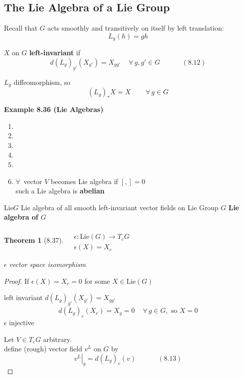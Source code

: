 \documentclass[11pt]{amsart}
\newtheorem{theorem}{Theorem}
\theoremstyle{definition}
\begin{document}
\subsection*{The Lie Algebra of a Lie Group}

Recall that $G$ acts smoothly and transitively on itself by left translation:
\[
L_g(h) = gh
\]

$X$ on $G$ \textbf{left-invariant} if
\begin{equation}
d(L_g)_{g'}(X_{g'}) = X_{gg'} \quad \, \forall \, g, g' \in G \quad \quad \quad \, (8.12)
\end{equation}

$L_g$ diffeomorphism, so
\[
(L_g)_*X = X \quad \quad \, \forall \, g \in G
\]





\textbf{Example 8.36 (Lie Algebras)}

\begin{enumerate}
\item[(a)]
\item[(b)]
\item[(c)]
\item[(d)]
\item[(e)]
\item[(f)] $\forall \, $ vector $V$ becomes Lie algebra if $[,]=0$ \\
such a Lie algebra is \textbf{abelian}
\end{enumerate}

$\text{Lie}{G}$ Lie algebra of all smooth left-invariant vector fields on Lie Group $G$ \textbf{ Lie algebra of $G$ }



\begin{theorem}[8.37] $\begin{aligned}  & \quad \\
    & \epsilon : \text{Lie}{(G)} \to T_eG \\
    & \epsilon(X) = X_e \end{aligned}$

$\epsilon$ vector space isomorphism
\end{theorem}

\begin{proof}
  If $\epsilon(X) = X_e = 0$ for some $X \in \text{Lie}{(G)}$

left invariant $d(L_g)_{g'}(X_{g'}) = X_{gg'}$
\[
d(L_g)_e(X_e) = X_g=0 \quad \, \forall \, g \in G, \text{ so } X= 0
\]
$\epsilon$ injective

Let $V \in T_eG$ arbitrary. \\
\quad define (rough) vector field $v^L$ on $G$ by
\begin{equation}
  \left. v^L \right|_g = d(L_g)_e(v) \quad \quad \quad \, (8.13)
\end{equation}

\end{proof}
\end{document}
